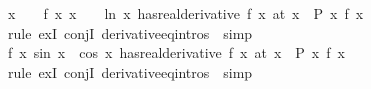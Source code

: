 \begin{isabellebody}
\isamarkupfalse%
\ {\isachardoublequoteopen}x\ {\isachargreater}{\kern0pt}\ {}\ {\isasymLongrightarrow}\ {\isasymexists}f{\isacharprime}{\kern0pt}{\isachardot}{\kern0pt}\ {\isacharparenleft}{\kern0pt}{\isacharparenleft}{\kern0pt}{\isasymlambda}x{\isachardot}{\kern0pt}\ {\isacharparenleft}{\kern0pt}x\ {\isacharminus}{\kern0pt}\ {}{\isacharparenright}{\kern0pt}\ {\isacharasterisk}{\kern0pt}\ ln\ x{\isacharparenright}{\kern0pt}\ has{\isacharunderscore}{\kern0pt}real{\isacharunderscore}{\kern0pt}derivative\ f{\isacharprime}{\kern0pt}\ x{\isacharparenright}{\kern0pt}\ {\isacharparenleft}{\kern0pt}at\ x{\isacharparenright}{\kern0pt}\ {\isasymand}\ P\ {\isacharparenleft}{\kern0pt}{\isasymlambda}x{\isachardot}{\kern0pt}\ f{\isacharprime}{\kern0pt}\ x{\isacharparenright}{\kern0pt}{\isachardoublequoteclose}\isanewline
%
\isadelimproof
\ \ %
\endisadelimproof
%
\isatagproof
{}\isamarkupfalse%
\ {\isacharparenleft}{\kern0pt}rule\ exI\ conjI\ derivative{\isacharunderscore}{\kern0pt}eq{\isacharunderscore}{\kern0pt}intros\ {\isacharbar}{\kern0pt}\ simp{\isacharparenright}{\kern0pt}{\isacharplus}{\kern0pt}\isanewline
\ \ \isamarkupfalse%
%
\endisatagproof
{\isafoldproof}%
%
\isadelimproof
\isanewline
%
\endisadelimproof
\isanewline
{}\isamarkupfalse%
\ {\isachardoublequoteopen}{\isasymexists}f{\isacharprime}{\kern0pt}{\isachardot}{\kern0pt}\ {\isacharparenleft}{\kern0pt}{\isacharparenleft}{\kern0pt}{\isasymlambda}x{\isachardot}{\kern0pt}\ {\isacharparenleft}{\kern0pt}sin\ x{\isacharparenright}{\kern0pt}\ {\isacharplus}{\kern0pt}\ {\isacharparenleft}{\kern0pt}cos\ x{\isacharparenright}{\kern0pt}\ has{\isacharunderscore}{\kern0pt}real{\isacharunderscore}{\kern0pt}derivative\ f{\isacharprime}{\kern0pt}\ x{\isacharparenright}{\kern0pt}\ {\isacharparenleft}{\kern0pt}at\ x{\isacharparenright}{\kern0pt}\ {\isasymand}\ P\ {\isacharparenleft}{\kern0pt}{\isasymlambda}x{\isachardot}{\kern0pt}\ f{\isacharprime}{\kern0pt}\ x{\isacharparenright}{\kern0pt}{\isachardoublequoteclose}\isanewline
%
\isadelimproof
\ \ %
\endisadelimproof
%
\isatagproof
{}\isamarkupfalse%
\ {\isacharparenleft}{\kern0pt}rule\ exI\ conjI\ derivative{\isacharunderscore}{\kern0pt}eq{\isacharunderscore}{\kern0pt}intros\ {\isacharbar}{\kern0pt}\ simp{\isacharparenright}{\kern0pt}{\isacharplus}{\kern0pt}\isanewline
\ \ \isamarkupfalse%
%
\endisatagproof
{\isafoldproof}%
%
\isadelimproof
\isanewline
%
\endisadelimproof
%
\isadelimtheory
\isanewline
%
\endisadelimtheory
%
\isatagtheory
{}\isamarkupfalse%
%
\endisatagtheory
{\isafoldtheory}%
%
\isadelimtheory
%
\endisadelimtheory
%
\end{isabellebody}%
